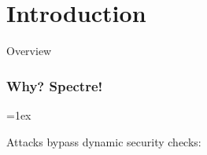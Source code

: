 \documentclass{beamer}
\begin{document}
\section{Introduction}
\begin{frame}{Overview}
  \begin{quotation}
  \tableofcontents
  \end{quotation}
\end{frame}

\begin{frame}[fragile]
  \frametitle{Why? Spectre!}

  {\fboxrule=1ex\fboxsep=0pt}\quad\pause
  \begin{minipage}[b]{.45\textwidth}\raggedright
    Attacks bypass dynamic security checks:


\end{minipage}
\end{frame}
\end{document}
